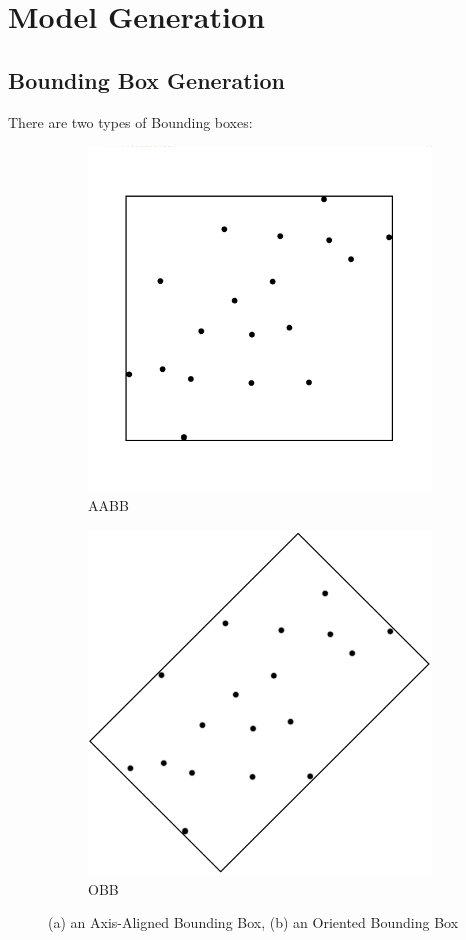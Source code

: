 		
\newpage
\section{Model Generation}
	\subsection{Bounding Box Generation}
		There are two types of Bounding boxes:
		
		\begin{figure}[H]
			\centering
			\begin{subfigure}{.5\textwidth}
				\centering
				\includegraphics[width=0.7\linewidth]{Includes/images/Axis-Aligned}
				\caption{AABB}
				\label{fig:AABB}
			\end{subfigure}%
			\begin{subfigure}{.5\textwidth}
				\centering
				\includegraphics[width=0.7\linewidth]{"Includes/images/Orienrted Bounding box"}
				\caption{OBB}
				\label{fig:OBB}
			\end{subfigure}
			\caption{(a) an Axis-Aligned Bounding Box, (b) an Oriented Bounding Box}
		\end{figure}
		
